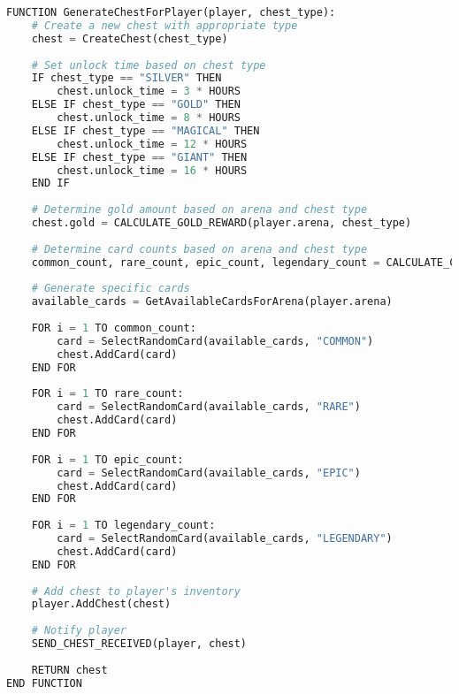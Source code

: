 \documentclass{article}
\begin{document}
\begin{lstlisting}[language=Python, caption=Chest Generation]
FUNCTION GenerateChestForPlayer(player, chest_type):
    # Create a new chest with appropriate type
    chest = CreateChest(chest_type)
    
    # Set unlock time based on chest type
    IF chest_type == "SILVER" THEN
        chest.unlock_time = 3 * HOURS
    ELSE IF chest_type == "GOLD" THEN
        chest.unlock_time = 8 * HOURS
    ELSE IF chest_type == "MAGICAL" THEN
        chest.unlock_time = 12 * HOURS
    ELSE IF chest_type == "GIANT" THEN
        chest.unlock_time = 16 * HOURS
    END IF
    
    # Determine gold amount based on arena and chest type
    chest.gold = CALCULATE_GOLD_REWARD(player.arena, chest_type)
    
    # Determine card counts based on arena and chest type
    common_count, rare_count, epic_count, legendary_count = CALCULATE_CARD_COUNTS(player.arena, chest_type)
    
    # Generate specific cards
    available_cards = GetAvailableCardsForArena(player.arena)
    
    FOR i = 1 TO common_count:
        card = SelectRandomCard(available_cards, "COMMON")
        chest.AddCard(card)
    END FOR
    
    FOR i = 1 TO rare_count:
        card = SelectRandomCard(available_cards, "RARE")
        chest.AddCard(card)
    END FOR
    
    FOR i = 1 TO epic_count:
        card = SelectRandomCard(available_cards, "EPIC")
        chest.AddCard(card)
    END FOR
    
    FOR i = 1 TO legendary_count:
        card = SelectRandomCard(available_cards, "LEGENDARY")
        chest.AddCard(card)
    END FOR
    
    # Add chest to player's inventory
    player.AddChest(chest)
    
    # Notify player
    SEND_CHEST_RECEIVED(player, chest)
    
    RETURN chest
END FUNCTION
\end{lstlisting}
\end{document}
